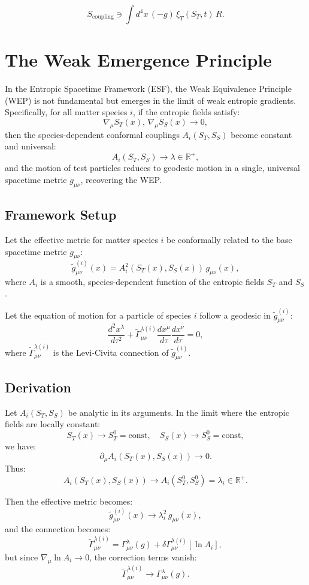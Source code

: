 \documentclass[12pt, a4paper]{article}
\begin{document}
\[
S_{\text{coupling}} \ni \int d^4 x \, (-g) \, \xi_T(S_T,t) \, R.
\]    

\section{The Weak Emergence Principle}

In the Entropic Spacetime Framework (ESF), the Weak Equivalence Principle (WEP) is not fundamental but emerges in the limit of weak entropic gradients. Specifically, for all matter species $i$, if the entropic fields satisfy:
\[
\nabla_\mu S_T(x), \, \nabla_\mu S_S(x) \to 0,
\]
then the species-dependent conformal couplings $A_i(S_T, S_S)$ become constant and universal:
\[
A_i(S_T, S_S) \to \lambda \in \mathbb{R}^{+},
\]
and the motion of test particles reduces to geodesic motion in a single, universal spacetime metric $g_{\mu\nu}$, recovering the WEP.

\subsection*{Framework Setup}

Let the effective metric for matter species $i$ be conformally related to the base spacetime metric $g_{\mu\nu}$:
\[
\tilde{g}^{(i)}_{\mu\nu}(x) = A_i^2(S_T(x), S_S(x)) \, g_{\mu\nu}(x),
\]
where $A_i$ is a smooth, species-dependent function of the entropic fields $S_T$ and $S_S$.

Let the equation of motion for a particle of species $i$ follow a geodesic in $\tilde{g}^{(i)}_{\mu\nu}$:
\[
\frac{d^2 x^\lambda}{d\tau^2} + \tilde{\Gamma}^{\lambda(i)}_{\mu\nu} \frac{dx^\mu}{d\tau} \frac{dx^\nu}{d\tau} = 0,
\]
where $\tilde{\Gamma}^{\lambda(i)}_{\mu\nu}$ is the Levi-Civita connection of $\tilde{g}^{(i)}_{\mu\nu}$.

\subsection*{Derivation}

Let $A_i(S_T, S_S)$ be analytic in its arguments. In the limit where the entropic fields are locally constant:
\[
S_T(x) \to S_T^0 = \text{const}, \quad S_S(x) \to S_S^0 = \text{const},
\]
we have:
\[
\partial_\mu A_i(S_T(x), S_S(x)) \to 0.
\]
Thus:
\[
A_i(S_T(x), S_S(x)) \to A_i(S_T^0, S_S^0) = \lambda_i \in \mathbb{R}^{+}.
\]

Then the effective metric becomes:
\[
\tilde{g}^{(i)}_{\mu\nu}(x) \to \lambda_i^2 \, g_{\mu\nu}(x),
\]
and the connection becomes:
\[
\tilde{\Gamma}^{\lambda(i)}_{\mu\nu} = \Gamma^{\lambda}_{\mu\nu}(g) + \delta\Gamma^{\lambda(i)}_{\mu\nu}[\ln A_i],
\]
but since $\nabla_\mu \ln A_i \to 0$, the correction terms vanish:
\[
\tilde{\Gamma}^{\lambda(i)}_{\mu\nu} \to \Gamma^{\lambda}_{\mu\nu}(g).
\]
\end{document}
